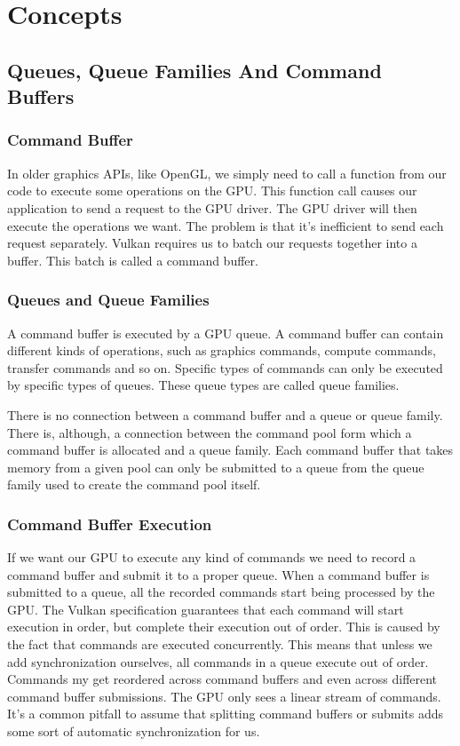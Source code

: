 \chapter{Concepts}

\section{Queues, Queue Families And Command Buffers}

\subsection{Command Buffer}

In older graphics APIs, like OpenGL, we simply need to call a function
from our code to execute some operations on the GPU.
This function call causes our application to send a request to the GPU driver.
The GPU driver will then execute the operations we want.
The problem is that it's inefficient to send each request separately.
Vulkan requires us to batch our requests together into a buffer.
This batch is called a command buffer.

\subsection{Queues and Queue Families}

A command buffer is executed by a GPU queue.
A command buffer can contain different kinds of operations, such as graphics
commands, compute commands, transfer commands and so on.
Specific types of commands can only be executed by specific types of queues.
These queue types are called queue families.

There is no connection between a command buffer and a queue or queue family.
There is, although, a connection between the command pool form which a command
buffer is allocated and a queue family.
Each command buffer that takes memory from a given pool can only be submitted
to a queue from the queue family used to create the command pool itself.

\subsection{Command Buffer Execution}

If we want our GPU to execute any kind of commands we need to record a command
buffer and submit it to a proper queue.
When a command buffer is submitted to a queue, all the recorded commands start
being processed by the GPU.
The Vulkan specification guarantees that each command will start execution
in order, but complete their execution out of order.
This is caused by the fact that commands are executed concurrently.
This means that unless we add synchronization ourselves, all commands
in a queue execute out of order.
Commands my get reordered across command buffers and even across different
command buffer submissions.
The GPU only sees a linear stream of commands.
It's a common pitfall to assume that splitting command buffers or submits adds
some sort of automatic synchronization for us.

